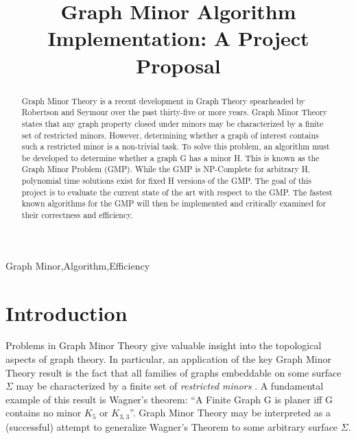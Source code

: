 \documentclass[12pt,conference]{IEEEtran}
\begin{document}
\raggedbottom

\title{Graph Minor Algorithm Implementation: A Project Proposal}

\author{
}

\maketitle

\begin{abstract}

Graph Minor Theory is a recent development in Graph Theory spearheaded by Robertson and Seymour over the past thirty-five or more years. Graph Minor Theory states that any graph property closed under minors may be characterized by a finite set of restricted minors. However, determining whether a graph of interest contains such a restricted minor is a non-trivial task. To solve this problem, an algorithm must be developed to determine whether a graph G has a minor H. This is known as the Graph Minor Problem (GMP). While the GMP is NP-Complete for arbitrary H, polynomial time solutions exist for fixed H versions of the GMP. The goal of this project is to evaluate the current state of the art with respect to the GMP. The fastest known algorithms for the GMP will then be implemented and critically examined for their correctness and efficiency.

\end{abstract}

\begin{IEEEkeywords}
Graph Minor,Algorithm,Efficiency
\end{IEEEkeywords}

\section{Introduction}

Problems in Graph Minor Theory give valuable insight into the topological aspects of graph theory. In particular, an application of the key Graph Minor Theory result is the fact that all families of graphs embeddable on some surface $\Sigma$ may be characterized by a finite set of \textit{restricted minors} \cite{robertson-seymour-final}. A fundamental example of this result is Wagner's theorem: ``A Finite Graph G is planer iff G contains no minor $K_{5}$ or $K_{3,3}$''. Graph Minor Theory may be interpreted as a (successful) attempt to generalize Wagner's Theorem to some arbitrary surface $\Sigma$. 
\end{document}
